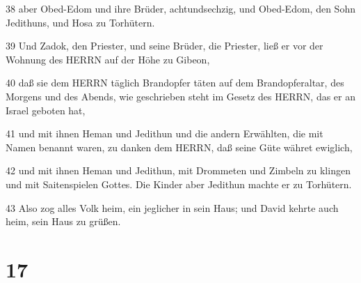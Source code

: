 \par 38 aber Obed-Edom und ihre Brüder, achtundsechzig, und Obed-Edom, den Sohn Jedithuns, und Hosa zu Torhütern.
\par 39 Und Zadok, den Priester, und seine Brüder, die Priester, ließ er vor der Wohnung des HERRN auf der Höhe zu Gibeon,
\par 40 daß sie dem HERRN täglich Brandopfer täten auf dem Brandopferaltar, des Morgens und des Abends, wie geschrieben steht im Gesetz des HERRN, das er an Israel geboten hat,
\par 41 und mit ihnen Heman und Jedithun und die andern Erwählten, die mit Namen benannt waren, zu danken dem HERRN, daß seine Güte währet ewiglich,
\par 42 und mit ihnen Heman und Jedithun, mit Drommeten und Zimbeln zu klingen und mit Saitenspielen Gottes. Die Kinder aber Jedithun machte er zu Torhütern.
\par 43 Also zog alles Volk heim, ein jeglicher in sein Haus; und David kehrte auch heim, sein Haus zu grüßen.

\chapter{17}

